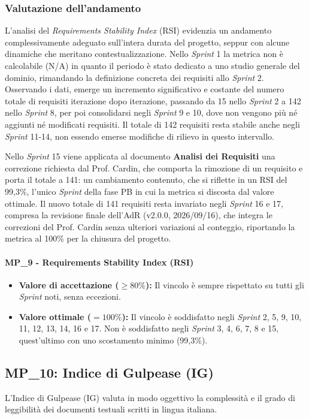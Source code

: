 \documentclass[12pt, a4paper]{article}
\begin{document}
\subsubsection*{Valutazione dell'andamento}
L'analisi del \textit{Requirements Stability Index} (RSI) evidenzia un andamento complessivamente adeguato sull'intera durata del progetto, seppur con alcune dinamiche che meritano contestualizzazione. Nello \textit{Sprint} 1 la metrica non è calcolabile (N/A) in quanto il periodo è stato dedicato a uno studio generale del dominio, rimandando la definizione concreta dei requisiti allo \textit{Sprint} 2. Osservando i dati, emerge un incremento significativo e costante del numero totale di requisiti iterazione dopo iterazione, passando da 15 nello \textit{Sprint} 2 a 142 nello \textit{Sprint} 8, per poi consolidarsi negli \textit{Sprint} 9 e 10, dove non vengono più né aggiunti né modificati requisiti. Il totale di 142 requisiti resta stabile anche negli \textit{Sprint} 11-14, non essendo emerse modifiche di rilievo in questo intervallo.

Nello \textit{Sprint} 15 viene applicata al documento \textbf{Analisi dei Requisiti} una correzione richiesta dal Prof. Cardin, che comporta la rimozione di un requisito e porta il totale a 141: un cambiamento contenuto, che si riflette in un RSI del 99,3\%, l'unico \textit{Sprint} della fase PB in cui la metrica si discosta dal valore ottimale. Il nuovo totale di 141 requisiti resta invariato negli \textit{Sprint} 16 e 17, compresa la revisione finale dell'AdR (v2.0.0, 2026/09/16), che integra le correzioni del Prof. Cardin senza ulteriori variazioni al conteggio, riportando la metrica al 100\% per la chiusura del progetto.

\paragraph*{MP\_9 - Requirements Stability Index (RSI)}
\begin{itemize}
    \item \textbf{Valore di accettazione ($\ge 80\%$):} Il vincolo è sempre rispettato su tutti gli \textit{Sprint} noti, senza eccezioni.
    \item \textbf{Valore ottimale ($= 100\%$):} Il vincolo è soddisfatto negli \textit{Sprint} 2, 5, 9, 10, 11, 12, 13, 14, 16 e 17. Non è soddisfatto negli \textit{Sprint} 3, 4, 6, 7, 8 e 15, quest'ultimo con uno scostamento minimo (99,3\%).
\end{itemize}

\subsection{MP\_10: Indice di Gulpease (IG)}
L'Indice di Gulpease (IG) valuta in modo oggettivo la complessità e il grado di leggibilità dei documenti testuali scritti in lingua italiana.
\end{document}
